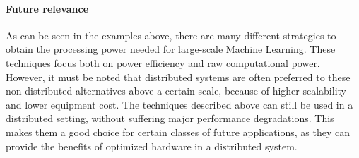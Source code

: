 \paragraph{Future relevance}
As can be seen in the examples above, there are many different strategies to obtain the processing power needed for large-scale Machine Learning. These techniques focus both on power efficiency and raw computational power. However, it must be noted that distributed systems are often preferred to these non-distributed alternatives above a certain scale, because of higher scalability and lower equipment cost. The techniques described above can still be used in a distributed setting, without suffering major performance degradations. This makes them a good choice for certain classes of future applications, as they can provide the benefits of optimized hardware in a distributed system.
